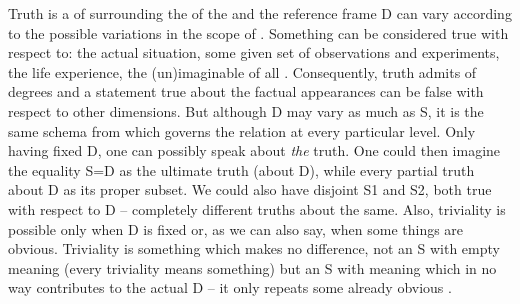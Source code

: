 \pa Truth is a  of  surrounding the 
of the  and the reference frame D can vary according to the
possible variations in the scope of . Something can be
considered true with respect to: the actual situation, some given set of
observations and experiments, the life experience, the (un)imaginable
 of all .  Consequently, truth admits of degrees
and a statement true about the factual appearances can be false with respect to
other dimensions. But although D may vary as much as S, it is the same schema
 from  which governs the relation at every
particular level.  Only having fixed D, one can possibly speak about {\em the}
truth. One could then imagine the equality S=D as the ultimate truth (about D),
while every partial truth about D as its proper subset. We could also have
disjoint S1 and S2, both true with respect to D -- completely different truths
about the same.  Also, triviality is possible only when D is fixed or, as we can
also say, when some things are obvious. Triviality is something which makes no
difference, not an S with empty meaning (every triviality means something)
but an S with meaning which in no way contributes to the actual D -- it only
repeats some already obvious .

